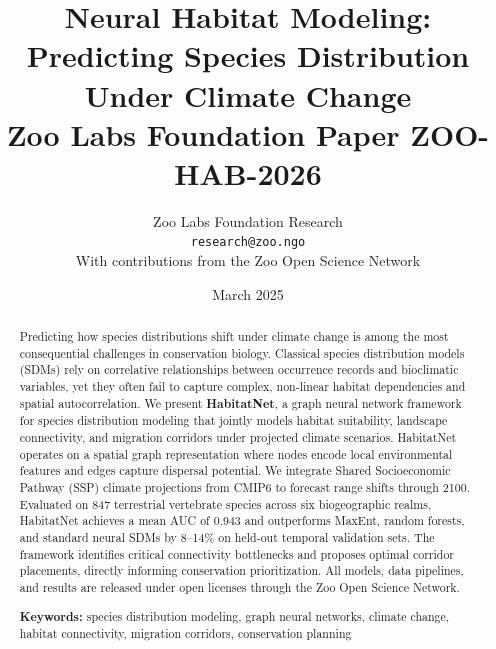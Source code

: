 \documentclass[11pt,a4paper]{article}
\title{%
  \textbf{Neural Habitat Modeling: Predicting Species Distribution\\
  Under Climate Change}\\[0.5em]
  \large Zoo Labs Foundation Paper ZOO-HAB-2026
}
\author{
  Zoo Labs Foundation Research\\
  \texttt{research@zoo.ngo}\\[0.5em]
  \small With contributions from the Zoo Open Science Network
}
\date{March 2025}
\begin{document}
\zoocoverpage

\begin{abstract}
\noindent
Predicting how species distributions shift under climate change is among
the most consequential challenges in conservation biology. Classical
species distribution models (SDMs) rely on correlative relationships
between occurrence records and bioclimatic variables, yet they often fail
to capture complex, non-linear habitat dependencies and spatial
autocorrelation. We present \textbf{HabitatNet}, a graph neural network
framework for species distribution modeling that jointly models habitat
suitability, landscape connectivity, and migration corridors under
projected climate scenarios. HabitatNet operates on a spatial graph
representation where nodes encode local environmental features and edges
capture dispersal potential. We integrate Shared Socioeconomic Pathway
(SSP) climate projections from CMIP6 to forecast range shifts through
2100. Evaluated on 847 terrestrial vertebrate species across six
biogeographic realms, HabitatNet achieves a mean AUC of 0.943 and
outperforms MaxEnt, random forests, and standard neural SDMs by
8--14\% on held-out temporal validation sets. The framework identifies
critical connectivity bottlenecks and proposes optimal corridor
placements, directly informing conservation prioritization. All models,
data pipelines, and results are released under open licenses through the
Zoo Open Science Network.

\medskip
\noindent\textbf{Keywords:} species distribution modeling, graph neural
networks, climate change, habitat connectivity, migration corridors,
conservation planning
\end{abstract}

\newpage
\tableofcontents
\newpage
















\end{document}
